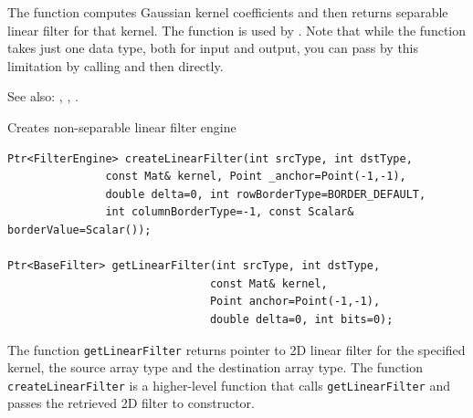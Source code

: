 The function  computes Gaussian kernel coefficients and then returns separable linear filter for that kernel. The function is used by . Note that while the function takes just one data type, both for input and output, you can pass by this limitation by calling  and then  directly.

See also: , , .

\label{createLinearFilter}
Creates non-separable linear filter engine

\begin{lstlisting}
Ptr<FilterEngine> createLinearFilter(int srcType, int dstType,
               const Mat& kernel, Point _anchor=Point(-1,-1),
               double delta=0, int rowBorderType=BORDER_DEFAULT,
               int columnBorderType=-1, const Scalar& borderValue=Scalar());
               
Ptr<BaseFilter> getLinearFilter(int srcType, int dstType,
                               const Mat& kernel,
                               Point anchor=Point(-1,-1),
                               double delta=0, int bits=0);
\end{lstlisting}
\begin{description}
\end{description}

The function \texttt{getLinearFilter} returns pointer to 2D linear filter for the specified kernel, the source array type and the destination array type. The function \texttt{createLinearFilter} is a higher-level function that calls \texttt{getLinearFilter} and passes the retrieved 2D filter to  constructor.

